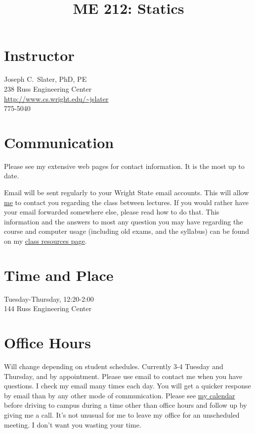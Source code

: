 \documentclass[10pt]{article}
\title{ME 212: Statics}
\author{}
\date{}
\begin{document}
\maketitle
\section*{Instructor}
Joseph C.~Slater, PhD, PE\\
238 Russ Engineering Center\\
\href{http://www.cs.wright.edu/~jslater}{\url{http://www.cs.wright.edu/~jslater}}\\
775-5040

\section*{Communication}
Please see my extensive web pages for contact information. It is the most up to date. 


 Email will be sent regularly to your Wright State email accounts.  This will allow \href{http://www.cs.wright.edu/~jslater}{me} to contact you regarding the class between lectures.  If you would rather have your email forwarded somewhere else, please read how to do that.  This information and the answers to most any question you may have regarding the course and computer usage (including old exams, and the syllabus) can be found on my \href{http://www.cs.wright.edu/~jslater/classes}{class resources page}.

\section*{Time and Place}
Tuesday-Thursday, 12:20-2:00\\
144 Russ Engineering Center

\section*{Office Hours}
Will change depending on student schedules. Currently 3-4  Tuesday and Thursday, and by appointment. Please use email to contact me when you have questions. I check my email many times each day. You will get a quicker response by {email} than by any other mode of communication. Please see  \href{http://www.cs.wright.edu/~jslater/phpicalendar}{my calendar} before driving to campus during a time other than office hours and follow up by giving me a call. It's not unusual for me to leave my office for an unscheduled meeting. I don't want you wasting your time. 
\end{document}
